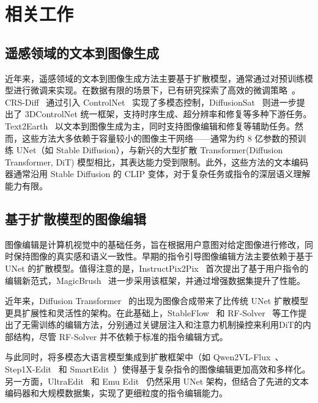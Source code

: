 \documentclass[12pt,a4paper]{article}
\begin{document}
\section{相关工作}

\subsection{遥感领域的文本到图像生成}

近年来，遥感领域的文本到图像生成方法主要基于扩散模型，通常通过对预训练模型进行微调来实现。在数据有限的场景下，已有研究探索了高效的微调策略~\parencite{ouMethodEfficientSynthesizing2023}。CRS-Diff~\parencite{tangCRSDiffControllableRemote2024} 通过引入 ControlNet~\parencite{controlnet2023} 实现了多模态控制，DiffusionSat~\parencite{khannaDiffusionSatGenerativeFoundation2023} 则进一步提出了 3DControlNet 统一框架，支持时序生成、超分辨率和修复等多种下游任务。Text2Earth~\parencite{liuText2EarthUnlockingTextdriven2025a} 以文本到图像生成为主，同时支持图像编辑和修复等辅助任务。然而，这些方法大多依赖于容量较小的图像主干网络——通常为约 8 亿参数的预训练 UNet（如 Stable Diffusion），与新兴的大型扩散 Transformer(Diffusion Transformer, DiT) 模型相比，其表达能力受到限制。此外，这些方法的文本编码器通常沿用 Stable Diffusion 的 CLIP 变体，对于复杂任务或指令的深层语义理解能力有限。

\subsection{基于扩散模型的图像编辑}

图像编辑是计算机视觉中的基础任务，旨在根据用户意图对给定图像进行修改，同时保持图像的真实感和语义一致性。早期的指令引导图像编辑方法主要依赖于基于 UNet 的扩散模型。值得注意的是，InstructPix2Pix~\parencite{instructpix2pix2023} 首次提出了基于用户指令的编辑新范式，MagicBrush~\parencite{magicbrush2023} 进一步采用该框架，并通过增强数据集提升了性能。

近年来，Diffusion Transformer~\parencite{peebles2023} 的出现为图像合成带来了比传统 UNet 扩散模型更具扩展性和灵活性的架构。在此基础上，StableFlow~\parencite{stableflow2024} 和 RF-Solver~\parencite{rfsolver2024} 等工作提出了无需训练的编辑方法，分别通过关键层注入和注意力机制操控来利用DiT的内部结构，尽管 RF-Solver 并不依赖于标准的指令编辑方式。

与此同时，将多模态大语言模型集成到扩散框架中（如 Qwen2VL-Flux~\parencite{qwen2vlflux2025}、Step1X-Edit~\parencite{step1xedit2025} 和 SmartEdit~\parencite{smartedit2024}）使得基于复杂指令的图像编辑更加高效和多样化。另一方面，UltraEdit~\parencite{ultraedit2024} 和 Emu Edit~\parencite{emuedit2024} 仍然采用 UNet 架构，但结合了先进的文本编码器和大规模数据集，实现了更细粒度的指令编辑能力。
\end{document}
